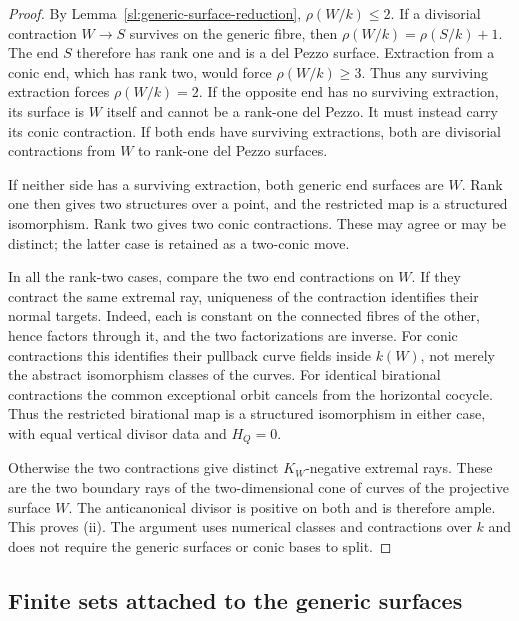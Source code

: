\begin{proof}
By Lemma~\ref{sl:generic-surface-reduction}, $\rho(W/k)\leq2$.
If a divisorial contraction $W\to S$ survives on the generic fibre,
then $\rho(W/k)=\rho(S/k)+1$.  The end $S$ therefore has rank one and
is a del Pezzo surface.  Extraction from a conic end, which has rank
two, would force $\rho(W/k)\geq3$.  Thus any surviving extraction forces
$\rho(W/k)=2$.  If the opposite end has no surviving extraction, its
surface is $W$ itself and cannot be a rank-one del Pezzo.  It must
instead carry its conic contraction.  If both ends have surviving
extractions, both are divisorial contractions from $W$ to rank-one
del Pezzo surfaces.

If neither side has a surviving extraction, both generic end surfaces
are $W$.  Rank one then gives two structures over a point, and the
restricted map is a structured isomorphism.  Rank two gives two conic
contractions.  These may agree or may be distinct; the latter case is
retained as a two-conic move.

In all the rank-two cases, compare the two end contractions on $W$.
If they contract the same extremal ray, uniqueness of the contraction
identifies their normal targets.  Indeed, each is constant on the
connected fibres of the other, hence factors through it, and the two
factorizations are inverse.  For conic contractions this identifies
their pullback curve fields inside $k(W)$, not merely the abstract
isomorphism classes of the curves.  For identical birational
contractions the common exceptional orbit cancels from the horizontal
cocycle.  Thus the restricted birational map is a structured
isomorphism in either case, with equal vertical divisor data and
$H_Q=0$.

Otherwise the two contractions give distinct $K_W$-negative extremal
rays.  These are the two boundary rays of the two-dimensional cone of
curves of the projective surface $W$.  The anticanonical divisor is
positive on both and is therefore ample.  This proves \textup{(ii)}.
The argument uses numerical classes and contractions over $k$ and
does not require the generic surfaces or conic bases to split.
\end{proof}

\subsection{Finite sets attached to the generic surfaces}
\label{sl:generic-sets}

